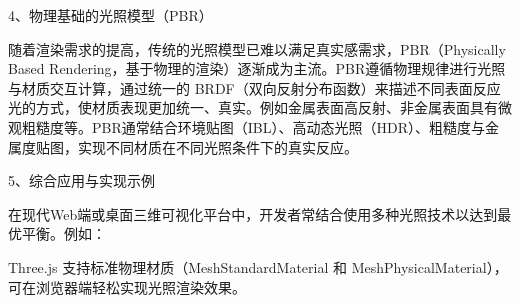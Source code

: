 4、物理基础的光照模型（PBR）

随着渲染需求的提高，传统的光照模型已难以满足真实感需求，PBR（Physically Based Rendering，基于物理的渲染）逐渐成为主流。PBR遵循物理规律进行光照与材质交互计算，通过统一的 BRDF（双向反射分布函数）来描述不同表面反应光的方式，使材质表现更加统一、真实。例如金属表面高反射、非金属表面具有微观粗糙度等。PBR通常结合环境贴图（IBL）、高动态光照（HDR）、粗糙度与金属度贴图，实现不同材质在不同光照条件下的真实反应。

5、综合应用与实现示例

在现代Web端或桌面三维可视化平台中，开发者常结合使用多种光照技术以达到最优平衡。例如：

\begin{Shaded}
\begin{Highlighting}[]
\OperatorTok{=} \NormalTok{(}\OperatorTok{,} \NormalTok{)}\OperatorTok{;}

\NormalTok{(}\OperatorTok{,} \OperatorTok{,} \NormalTok{)}\OperatorTok{;}

\OperatorTok{;}


\OperatorTok{=} \NormalTok{()}\NormalTok{(}\NormalTok{)}\OperatorTok{;}

\OperatorTok{=} \NormalTok{(\{}

\OperatorTok{:}\OperatorTok{,}

\OperatorTok{:} \OperatorTok{,}

\OperatorTok{:} 

\NormalTok{\})}\OperatorTok{;}

\end{Highlighting}
\end{Shaded}

Three.js 支持标准物理材质（MeshStandardMaterial 和 MeshPhysicalMaterial），可在浏览器端轻松实现光照渲染效果。

